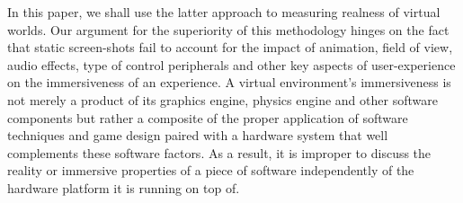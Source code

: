  In this paper, we shall use the latter approach to measuring realness of virtual worlds. Our argument for the superiority of this methodology hinges on the fact that static screen-shots fail to account for the impact of animation, field of view, audio effects, type of control peripherals and other key aspects of user-experience on the immersiveness of an experience. A virtual environment's immersiveness is not merely a product of its graphics engine, physics engine and other software components but rather a composite of the proper application of software techniques and game design paired with a hardware system that well complements these software factors. As a result, it is improper to discuss the reality or immersive properties of
a piece of software independently of the hardware platform it is running on top of. 

